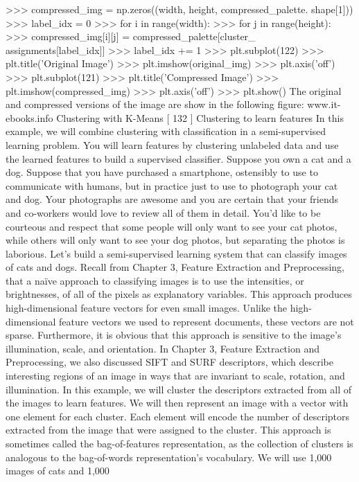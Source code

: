 >>> compressed_img = np.zeros((width, height, compressed_palette.
shape[1]))
>>> label_idx = 0
>>> for i in range(width):
>>> for j in range(height):
>>> compressed_img[i][j] = compressed_palette[cluster_
assignments[label_idx]]
>>> label_idx += 1
>>> plt.subplot(122)
>>> plt.title('Original Image')
>>> plt.imshow(original_img)
>>> plt.axis('off')
>>> plt.subplot(121)
>>> plt.title('Compressed Image')
>>> plt.imshow(compressed_img)
>>> plt.axis('off')
>>> plt.show()
The original and compressed versions of the image are show in the following figure:
www.it-ebooks.info
Clustering with K-Means
[ 132 ]
Clustering to learn features
In this example, we will combine clustering with classification in a semi-supervised
learning problem. You will learn features by clustering unlabeled data and use the
learned features to build a supervised classifier.
Suppose you own a cat and a dog. Suppose that you have purchased a smartphone,
ostensibly to use to communicate with humans, but in practice just to use to
photograph your cat and dog. Your photographs are awesome and you are certain
that your friends and co-workers would love to review all of them in detail. You'd
like to be courteous and respect that some people will only want to see your cat
photos, while others will only want to see your dog photos, but separating the
photos is laborious. Let's build a semi-supervised learning system that can classify
images of cats and dogs.
Recall from Chapter 3, Feature Extraction and Preprocessing, that a naïve approach
to classifying images is to use the intensities, or brightnesses, of all of the pixels as
explanatory variables. This approach produces high-dimensional feature vectors for
even small images. Unlike the high-dimensional feature vectors we used to represent
documents, these vectors are not sparse. Furthermore, it is obvious that this approach
is sensitive to the image's illumination, scale, and orientation. In Chapter 3, Feature
Extraction and Preprocessing, we also discussed SIFT and SURF descriptors, which
describe interesting regions of an image in ways that are invariant to scale, rotation,
and illumination. In this example, we will cluster the descriptors extracted from all of
the images to learn features. We will then represent an image with a vector with one
element for each cluster. Each element will encode the number of descriptors extracted
from the image that were assigned to the cluster. This approach is sometimes called
the bag-of-features representation, as the collection of clusters is analogous to the
bag-of-words representation's vocabulary. We will use 1,000 images of cats and 1,000
